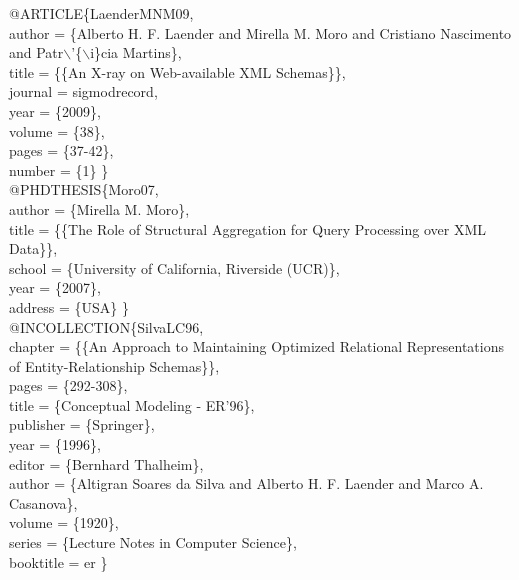\documentclass[kdmile,a4paper]{kdmile} %
\newenvironment{latexcode}
{\ttfamily\vspace{0.1in}\setlength{\parindent}{18pt}}
{\vspace{0.1in}}
\begin{document}
\begin{latexcode}
@ARTICLE\{LaenderMNM09,\\\indent\indent
  author = \{Alberto H. F. Laender and Mirella M. Moro and Cristiano Nascimento\\\indent\indent
	and Patr$\backslash$'\{$\backslash$i\}cia Martins\},\\\indent\indent
  title = \{\{An X-ray on Web-available XML Schemas\}\},\\\indent\indent
  journal = sigmodrecord,\\\indent\indent
  year = \{2009\},\\\indent\indent
  volume = \{38\},\\\indent\indent
  pages = \{37-42\},\\\indent\indent
  number = \{1\} \}\\

@PHDTHESIS\{Moro07,\\\indent\indent
  author = \{Mirella M. Moro\},\\\indent\indent
  title = \{\{The Role of Structural Aggregation for Query Processing over XML Data\}\},\\\indent\indent
  school = \{University of California, Riverside (UCR)\},\\\indent\indent
  year = \{2007\},\\\indent\indent
  address = \{USA\} \}\\

@INCOLLECTION\{SilvaLC96,\\\indent\indent
  chapter = \{\{An Approach to Maintaining Optimized Relational Representations\\\indent\indent
	of Entity-Relationship Schemas\}\},\\\indent\indent
  pages = \{292-308\},\\\indent\indent
  title = \{Conceptual Modeling - ER'96\},\\\indent\indent
  publisher = \{Springer\},\\\indent\indent
  year = \{1996\},\\\indent\indent
  editor = \{Bernhard Thalheim\},\\\indent\indent
  author = \{Altigran Soares da Silva and Alberto H. F. Laender and Marco A. Casanova\},\\\indent\indent
  volume = \{1920\},\\\indent\indent
  series = \{Lecture Notes in Computer Science\},\\\indent\indent
  booktitle = er \}
  
\end{latexcode}
\end{document}
